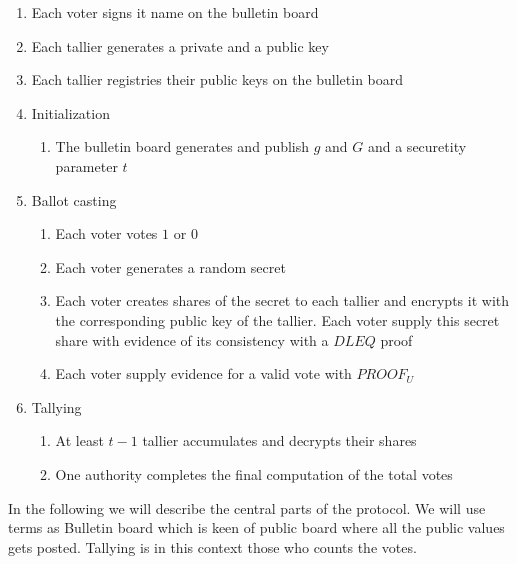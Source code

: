 \begin{infobox}
\begin{enumerate}
\item Each voter signs it name on the bulletin board
\item Each tallier generates a private and a public key
\item Each tallier registries their public keys on the bulletin board
\item Initialization
\begin{enumerate}
\item The bulletin board generates and publish $g$ and $G$ and a securetity parameter $t$
\end{enumerate}
\item Ballot casting
\begin{enumerate}
\item Each voter votes $1$ or $0$
\item Each voter generates a random secret
\item Each voter creates shares of the secret to each tallier and encrypts it with the corresponding public key of the tallier. Each voter supply this secret share with evidence of its consistency with a $DLEQ$ proof
\item Each voter supply evidence for a valid vote with $PROOF_U$
\end{enumerate}
\item Tallying
\begin{enumerate}
\item At least $t-1$ tallier accumulates and decrypts their shares
\item One authority completes the final computation of the total votes
\end{enumerate}
\end{enumerate}
\end{infobox}

\noindent
In the following we will describe the central parts of the protocol. We will use terms as Bulletin board which is keen of public board where all the public values gets posted. Tallying is in this context those who counts the votes.


